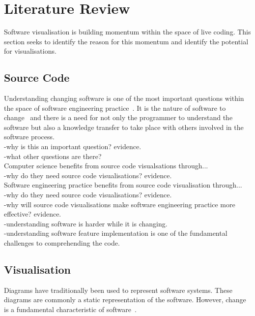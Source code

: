 
\chapter{Literature Review}
\label{cha:literaturereview}

Software visualisation is building momentum within the space of live coding. This section seeks to identify the reason for this momentum and identify the potential for visualisations.

\section{Source Code}

Understanding changing software is one of the most important questions within the space of software engineering practice~\cite{Tao2012}. It is the nature of software to change~\cite{Purushothaman2005} and there is a need for not only the programmer to understand the software but also a knowledge transfer to take place with others involved in the software process.\\
-why is this an important question? evidence.\\
-what other questions are there?\\

Computer science benefits from source code visualsations through...\\
-why do they need source code visualisations? evidence.\\

Software engineering practice benefits from source code visualisation through...\\
-why do they need source code visualisations? evidence.\\
-why will source code visualisations make software engineering practice more effective? evidence.\\
-understanding software is harder while it is changing. \cite{Eisenbarth2003}\\
-understanding software feature implementation is one of the fundamental challenges to comprehending the code.\cite{Eisenbarth2003}\\


\section{Visualisation}

Diagrams have traditionally been used to represent software systems. These diagrams are commonly a static representation of the software. However, change is a fundamental characteristic of software~\cite{Purushothaman2005}.\\


